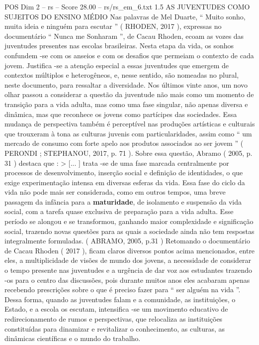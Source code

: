 \begin{textsample}{POS Dim 2 – rs – Score 28.00 – rs/rs\_em\_6.txt}  \label{ex:f2_pos_076}
1.5 AS JUVENTUDES COMO SUJEITOS DO ENSINO MÉDIO Nas palavras de Mel Duarte, “ Muito sonho, muita ideia e ninguém para escutar ” ( RHODEN, 2017 ), expressas no documentário “ Nunca me Sonharam ”, de Cacau Rhoden, ecoam as vozes das juventudes presentes nas escolas brasileiras.
Nesta etapa da vida, os sonhos confundem -se com os anseios e com os desafios que permeiam o contexto de cada jovem.
Justifica -se a atenção especial a essas juventudes que emergem de contextos múltiplos e heterogêneos, e, nesse sentido, são nomeadas no plural, neste documento, para ressaltar a diversidade.
Nos últimos vinte anos, um novo olhar passou a considerar a questão da juventude não mais como um momento de transição para a vida adulta, mas como uma fase singular, não apenas diversa e dinâmica, mas que reconhece os jovens como partícipes das sociedades.
Essa mudança de perspectiva também é perceptível nas produções artísticas e culturais que trouxeram à tona as culturas juvenis com particularidades, assim como “ um mercado de consumo com forte apelo aos produtos associados ao ser jovem ” ( PERONDI ; STEPHANOU, 2017, p. 71 ).
Sobre essa questão, Abramo ( 2005, p. 31 ) destaca que : > [... ] trata -se de uma fase marcada centralmente por processos de desenvolvimento, inserção social e definição de identidades, o que exige experimentação intensa em diversas esferas da vida.
Essa fase do ciclo da vida não pode mais ser considerada, como em outros tempos, uma breve passagem da infância para a \textbf{maturidade}, de isolamento e suspensão da vida social, com a tarefa quase exclusiva de preparação para a vida adulta.
Esse período se alongou e se transformou, ganhando maior complexidade e significação social, trazendo novas questões para as quais a sociedade ainda não tem respostas integralmente formuladas. ( ABRAMO, 2005, p.31 ) Retomando o documentário de Cacau Rhoden ( 2017 ), ficam claros diversos pontos acima mencionados, entre eles, a multiplicidade de visões de mundo dos jovens, a necessidade de considerar o tempo presente nas juventudes e a urgência de dar voz aos estudantes trazendo -os para o centro das discussões, pois durante muitos anos eles acabaram apenas recebendo prescrições sobre o que é preciso fazer para “ ser alguém na vida ”.
Dessa forma, quando as juventudes falam e a comunidade, as instituições, o Estado, e a escola os escutam, intensifica -se um movimento educativo de redirecionamento de rumos e perspectivas, que relocaliza as instituições constituídas para dinamizar e revitalizar o conhecimento, as culturas, as dinâmicas científicas e o mundo do trabalho.

\end{textsample}
